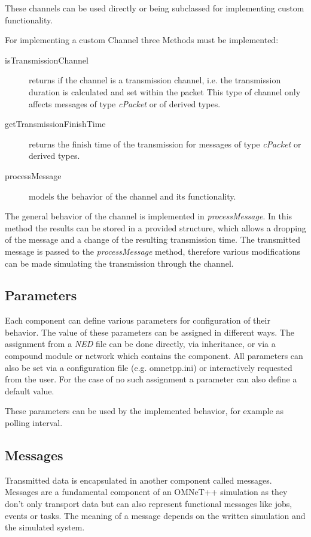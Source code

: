 These channels can be used directly or being subclassed for implementing custom functionality. \cite[section 3.5]{omnet_manual}

For implementing a custom Channel three Methods must be implemented:

\begin{description}
    \item[isTransmissionChannel] returns if the channel is a transmission channel, i.e. the transmission duration is calculated and set within the packet
    This type of channel only affects messages of type \emph{cPacket} or of derived types.
    \item[getTransmissionFinishTime] returns the finish time of the transmission for messages of type \emph{cPacket} or derived types.
    \item[processMessage] models the behavior of the channel and its functionality.
\end{description}

The general behavior of the channel is implemented in \emph{processMessage}.
In this method the results can be stored in a provided structure, which allows a dropping of the message and a change of the resulting transmission time.
The transmitted message is passed to the \emph{processMessage} method, therefore various modifications can be made simulating the transmission through the channel. \cite[section 4.8]{omnet_manual}

\subsection{Parameters}
\label{sec:omnet_components_parameters}
Each component can define various parameters for configuration of their behavior.
The value of these parameters can be assigned in different ways.
The assignment from a \emph{NED} file can be done directly, via inheritance, or via a compound module or network which contains the component.
All parameters can also be set via a configuration file (e.g. omnetpp.ini) or interactively requested from the user.
For the case of no such assignment a parameter can also define a default value.

These parameters can be used by the implemented behavior, for example as polling interval. \cite[section 3.6]{omnet_manual}


\subsection{Messages}
\label{sec:omnet_components_messages}
Transmitted data is encapsulated in another component called messages.
Messages are a fundamental component of an OMNeT++ simulation as they don't only transport data but can also represent functional messages like jobs, events or tasks.
The meaning of a message depends on the written simulation and the simulated system. \cite[chapter 5]{omnet_manual}

